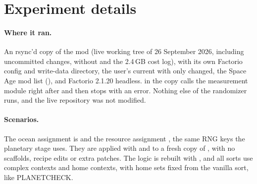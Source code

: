 \section{Experiment details}\label{app:experiment}

\paragraph{Where it ran.} An rsync'd copy of the mod (live working tree of 26 September 2026, including uncommitted changes, without  and the 2.4\,GB cost log), with its own Factorio config and write-data directory, the user's current  with only  changed, the Space Age mod list (), and Factorio 2.1.20 headless.  in the copy calls the measurement module right after  and then stops with an error. Nothing else of the randomizer runs, and the live repository was not modified.

\paragraph{Scenarios.} The ocean assignment is  and the resource assignment , the same RNG keys the planetary stage uses. They are applied with  and  to a fresh copy of , with no scaffolds, recipe edits or extra patches. The logic is rebuilt with , and all sorts use complex contexts and home contexts, with home sets fixed from the vanilla sort, like PLANETCHECK.


